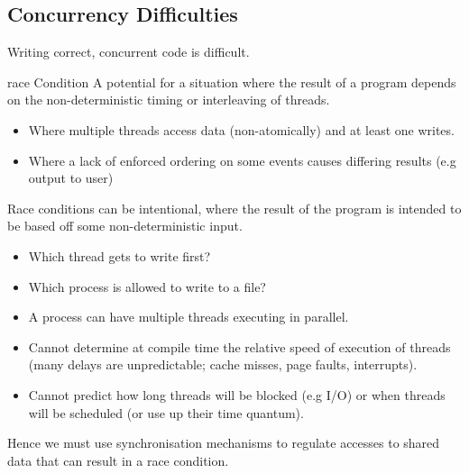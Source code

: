 \subsection{Concurrency Difficulties}
Writing correct, concurrent code is difficult.
\begin{definitionbox}{race Condition}
    A potential for a situation where the result of a program depends on the non-deterministic timing or interleaving of threads.
    \begin{itemize}
        \item Where multiple threads access data (non-atomically) and at least one writes.
        \item Where a lack of enforced ordering on some events causes differing results (e.g output to user)
    \end{itemize}
    Race conditions can be intentional, where the result of the program is intended to be based off some non-deterministic input.
    \begin{itemize}
        \item Which thread gets to write first?
        \item Which process is allowed to write to a file?
    \end{itemize}
\end{definitionbox}
\begin{itemize}
    \item A process can have multiple threads executing in parallel.
    \item Cannot determine at compile time the relative speed of execution of threads (many delays are unpredictable; cache misses, page faults, interrupts).
    \item Cannot predict how long threads will be blocked (e.g I/O) or when threads will be scheduled (or use up their time quantum).
\end{itemize}
Hence we must use synchronisation mechanisms to regulate accesses to shared data that can result in a race condition.

